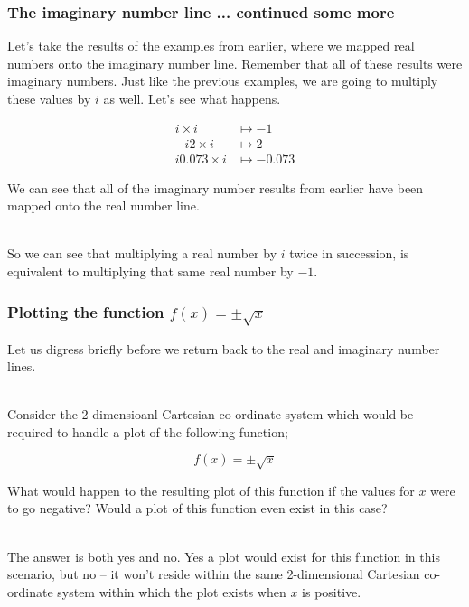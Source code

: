 \begin{frame}
\frametitle{The imaginary number line ... continued some more}

Let's take the results of the examples from earlier, where we mapped real numbers onto the imaginary number line. Remember that all of these results were
imaginary numbers. Just like the previous examples, we are going to multiply these values by \(i\) as well. Let's see what happens.

\begin{align*}
i \times i      &\mapsto -1 \\
-i2 \times i    &\mapsto 2 \\
i0.073 \times i &\mapsto -0.073
\end{align*}

We can see that all of the imaginary number results from earlier have been mapped onto the real number line.\\~\

So we can see that multiplying a real number by \(i\) twice in succession, is equivalent to multiplying that same real number by \(-1\).

\end{frame}


%
%

\begin{frame}
\frametitle{Plotting the function \(f(x) = \pm\sqrt{x}\)}

Let us digress briefly before we return back to the real and imaginary number lines.\\~\

Consider the 2-dimensioanl Cartesian co-ordinate system which would be required to handle a plot of the following function;

\begin{equation}
  f(x) = \pm\sqrt{x}
\end{equation}

What would happen to the resulting plot of this function if the values for \(x\) were to go negative? Would a plot of this function even exist in this case?\\~\

The answer is both yes and no. Yes a plot would exist for this function in this scenario, but no -- it won't reside within the same 2-dimensional Cartesian
co-ordinate system within which the plot exists when \(x\) is positive.\\~\

\end{frame}


